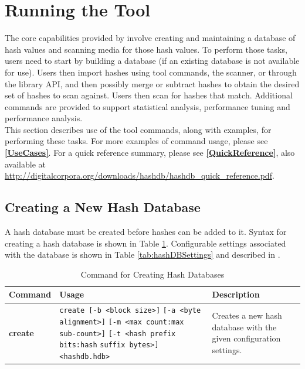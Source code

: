\documentclass[11pt,fleqn]{article} %
\begin{document}
\section {Running the \hdb Tool}
\label{Running}
The core capabilities provided by \hdb involve creating and maintaining a database of hash values and scanning media for those hash values. To perform those tasks, \hdb users need to start by building a database (if an existing database is not available for use).
Users then import hashes using \hdb tool commands, the \hdb \bulk scanner, or through the \hdb library API, and then possibly merge or subtract hashes to obtain the desired set of hashes to scan against.
Users then scan for hashes that match.
Additional commands are provided to support statistical analysis, performance tuning and performance analysis.\\

This section describes use of the \hdb tool commands, along with examples, for performing these tasks.
For more examples of command usage, please see \textbf{\autoref{UseCases}}.
For a \hdb quick reference summary, please see \textbf{\autoref{QuickReference}}, also available at \url{http://digitalcorpora.org/downloads/hashdb/hashdb_quick_reference.pdf}.

\subsection{Creating a New Hash Database}
\label{Creating}
A hash database must be created before hashes can be added to it.
Syntax for creating a hash database is shown in Table \ref{tab:createDatabase}.
Configurable settings associated with the database is shown in Table \ref{tab:hashDBSettings} and described in \textbf{}.\\
\begin{table}[!ht]
\centering
\caption{Command for Creating Hash Databases}
\label{tab:createDatabase}
\begin{tabular}{|p{2.5 cm}|p{7 cm}|p{4 cm}|}
\hline \hline
\textbf{Command} & \textbf{Usage} & \textbf{Description} \\
\hline
\textbf{create} & \verb+create [-b <block size>]+ \verb+[-a <byte alignment>]+ \verb+[-m <max count:max sub-count>]+ \verb+[-t <hash prefix bits:hash+ \verb+suffix bytes>]+ \verb+<hashdb.hdb>+ & Creates a new hash database with the given configuration settings.\\
\hline
\end{tabular}
\end{table}
\end{document}
